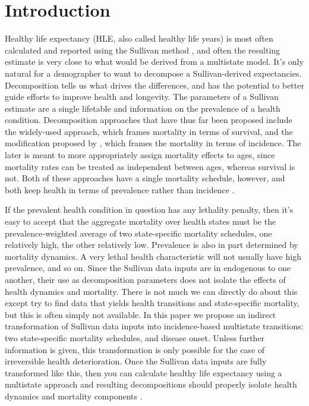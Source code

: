 \documentclass[sn-apa]{sn-jnl}%
\theoremstyle{thmstyleone}%
\theoremstyle{thmstyletwo}%
\theoremstyle{thmstylethree}%
\begin{document}
\section{Introduction}\label{sec1}


Healthy life expectancy (HLE, also called healthy life years) is most often calculated and reported using the Sullivan method \citep{sullivan1971single}, and often the resulting estimate is very close to what would be derived from a multistate model. It's only natural for a demographer to want to decompose a Sullivan-derived expectancies. Decomposition tells us what drives the differences, and has the potential to better guide efforts to improve health and longevity. The parameters of a Sullivan estimate are a single lifetable and information on the prevalence of a health condition. Decomposition approaches that have thus far been proposed include the widely-used \citet{nusselder2004decomposition} approach, which frames mortality in terms of survival, and the modification proposed by \citet{shkolnikov2017decomposition}, which frames the mortality in terms of incidence. The later is meant to more appropriately assign mortality effects to ages, since mortality rates can be treated as independent between ages, whereas survival is not. Both of these approaches have a single mortality schedule, however, and both keep health in terms of prevalence rather than incidence \citep{luy2020life}.

If the prevalent health condition in question has any lethality penalty, then it's easy to accept that the aggregate mortality over health states must be the prevalence-weighted average of two state-specific mortality schedules, one relatively high, the other relatively low. Prevalence is also in part determined by mortality dynamics. A very lethal health characteristic will not usually have high prevalence, and so on. Since the Sullivan data inputs are in endogenous to one another, their use as decomposition parameters does not isolate the effects of health dynamics and mortality. There is not much we can directly do about this except try to find data that yields health transitions and state-specific mortality, but this is often simply not available. In this paper we propose an indirect transformation of Sullivan data inputs into incidence-based multistate transitions: two state-specific mortality schedules, and disease onset. Unless further information is given, this transformation is only possible for the case of irreversible health deterioration. Once the Sullivan data inputs are fully transformed like this, then you can calculate healthy life expectancy using a multistate approach \citep[see e.g.,][]{caswell2021healthy} and resulting decompositions should properly isolate health dynamics and mortality components \citep{shen2023decomposition,moretti2023multistate}.
\end{document}
